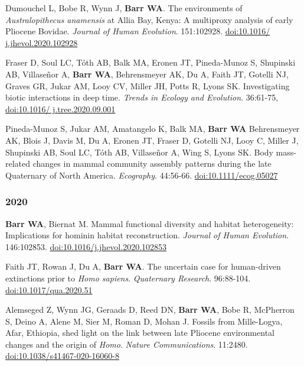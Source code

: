 \item Dumouchel L, Bobe R, Wynn J, {\bfseries Barr WA}. The environments of \emph{Australopithecus anamensis} at Allia Bay, Kenya: A multiproxy analysis of early Pliocene Bovidae. \emph{Journal of Human Evolution}. 151:102928. \href{https://doi.org/10.1016/j.jhevol.2020.102928}{doi:10.1016/ j.jhevol.2020.102928}

\item Fraser D, Soul LC, Tóth AB, Balk MA, Eronen JT, Pineda-Munoz S, Shupinski AB, Villaseñor A, {\bfseries Barr WA}, Behrensmeyer AK, Du A, Faith JT, Gotelli NJ, Graves GR, Jukar AM, Looy CV, Miller JH, Potts R, Lyons SK. Investigating biotic interactions in deep time. \emph{Trends in Ecology and Evolution}. 36:61-75, \href{https://doi.org/10.1016/j.tree.2020.09.001}{doi:10.1016/ j.tree.2020.09.001} 

\item Pineda-Munoz S, Jukar AM, Amatangelo K, Balk MA, {\bfseries Barr WA} Behrensmeyer AK, Blois J, Davis M, Du A, Eronen JT, Fraser D, Gotelli NJ, Looy C, Miller J, Shupinski AB, Soul LC, Tóth AB, Villaseñor A, Wing S, Lyons SK. Body mass-related changes in mammal community assembly patterns during the late Quaternary of North America. \emph{Ecography}. 44:56-66. \href{https://dx.doi.org/10.1111/ecog.05027}{doi:10.1111/ecog.05027}


\subsubsection*{2020}



\item {\bfseries Barr WA}, Biernat M. Mammal functional diversity and habitat heterogeneity: Implications for hominin habitat reconstruction. \emph{Journal of Human Evolution}. 146:102853. \href{https://dx.doi.org/10.1016/j.jhevol.2020.102853}{doi:10.1016/j.jhevol.2020.102853}

\item Faith JT, Rowan J, Du A, {\bfseries Barr WA}. The uncertain case for human-driven extinctions prior to \emph{Homo sapiens}. \emph{Quaternary Research}. 96:88-104. \href{https://dx.doi.org/10.1017/qua.2020.51}{doi:10.1017/qua.2020.51}

\item Alemseged Z, Wynn JG, Geraads D, Reed DN, {\bfseries Barr WA}, Bobe R, McPherron S, Deino A, Alene M, Sier M, Roman D,  Mohan J. Fossils from Mille-Logya, Afar, Ethiopia, shed light on the link between late Pliocene environmental changes and the origin of \emph{Homo}. \emph{Nature Communications}. 11:2480. \href{https://doi.org/10.1038/s41467-020-16060-8 }{doi:10.1038/s41467-020-16060-8}

